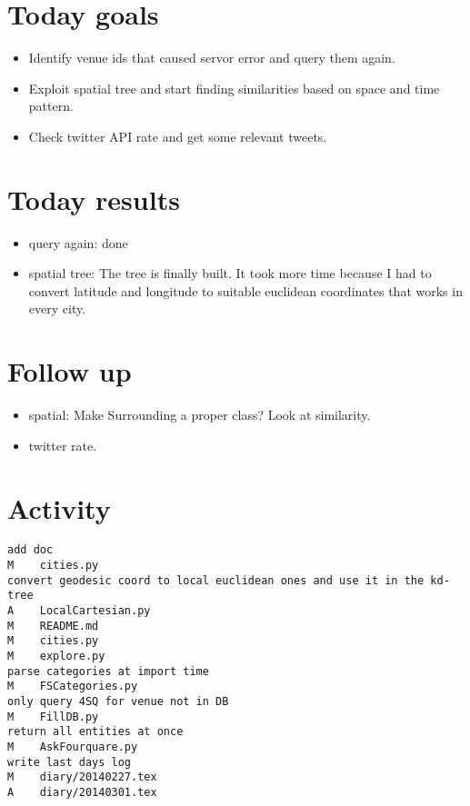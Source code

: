\section*{Today goals}
\begin{itemize}
	\item Identify venue ids that caused servor error and query them again.
	\item Exploit spatial tree and start finding similarities based on space
		and time pattern.
	\item Check twitter API rate and get some relevant tweets.
\end{itemize}

\section*{Today results}
\begin{itemize}
	\item query again: done
	\item spatial tree: The tree is finally built. It took more time because I
		had to convert latitude and longitude to suitable euclidean
		coordinates that works in every city.
\end{itemize}

\section*{Follow up}
\begin{itemize}
	\item spatial: Make Surrounding a proper class? Look at similarity.
	\item twitter rate.
\end{itemize}

\section*{Activity}
\begin{verbatim}
add doc
M    cities.py
convert geodesic coord to local euclidean ones and use it in the kd-tree
A    LocalCartesian.py
M    README.md
M    cities.py
M    explore.py
parse categories at import time
M    FSCategories.py
only query 4SQ for venue not in DB
M    FillDB.py
return all entities at once
M    AskFourquare.py
write last days log
M    diary/20140227.tex
A    diary/20140301.tex
\end{verbatim}
